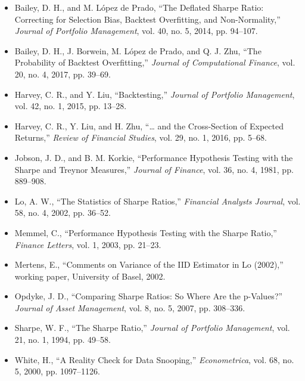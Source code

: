 \documentclass[11pt]{article}
\theoremstyle{remark}
\theoremstyle{definition}
\begin{document}
\begin{itemize}
\item Bailey, D. H., and M. L\'opez de Prado, ``The Deflated Sharpe Ratio: Correcting for Selection Bias, Backtest Overfitting, and Non-Normality,'' \emph{Journal of Portfolio Management}, vol. 40, no. 5, 2014, pp. 94--107.
\item Bailey, D. H., J. Borwein, M. L\'opez de Prado, and Q. J. Zhu, ``The Probability of Backtest Overfitting,'' \emph{Journal of Computational Finance}, vol. 20, no. 4, 2017, pp. 39--69.
\item Harvey, C. R., and Y. Liu, ``Backtesting,'' \emph{Journal of Portfolio Management}, vol. 42, no. 1, 2015, pp. 13--28.
\item Harvey, C. R., Y. Liu, and H. Zhu, ``\dots{} and the Cross-Section of Expected Returns,'' \emph{Review of Financial Studies}, vol. 29, no. 1, 2016, pp. 5--68.
\item Jobson, J. D., and B. M. Korkie, ``Performance Hypothesis Testing with the Sharpe and Treynor Measures,'' \emph{Journal of Finance}, vol. 36, no. 4, 1981, pp. 889--908.
\item Lo, A. W., ``The Statistics of Sharpe Ratios,'' \emph{Financial Analysts Journal}, vol. 58, no. 4, 2002, pp. 36--52.
\item Memmel, C., ``Performance Hypothesis Testing with the Sharpe Ratio,'' \emph{Finance Letters}, vol. 1, 2003, pp. 21--23.
\item Mertens, E., ``Comments on Variance of the IID Estimator in Lo (2002),'' working paper, University of Basel, 2002.
\item Opdyke, J. D., ``Comparing Sharpe Ratios: So Where Are the p-Values?'' \emph{Journal of Asset Management}, vol. 8, no. 5, 2007, pp. 308--336.
\item Sharpe, W. F., ``The Sharpe Ratio,'' \emph{Journal of Portfolio Management}, vol. 21, no. 1, 1994, pp. 49--58.
\item White, H., ``A Reality Check for Data Snooping,'' \emph{Econometrica}, vol. 68, no. 5, 2000, pp. 1097--1126.
\end{itemize}
\end{document}
